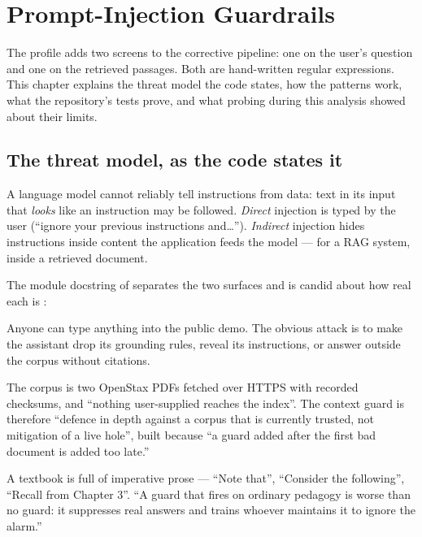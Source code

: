 \chapter{Prompt-Injection Guardrails}
\label{ch:guardrails}

The  profile adds two screens to the corrective pipeline: one on the user's question and one on the retrieved passages. Both are hand-written regular expressions. This chapter explains the threat model the code states, how the patterns work, what the repository's tests prove, and what probing during this analysis showed about their limits.

\section{The threat model, as the code states it}

\begin{background}
A language model cannot reliably tell instructions from data: text in its input that \emph{looks} like an instruction may be followed. \emph{Direct} injection is typed by the user (\enquote{ignore your previous instructions and\ldots}). \emph{Indirect} injection hides instructions inside content the application feeds the model --- for a RAG system, inside a retrieved document.
\end{background}

The module docstring of  separates the two surfaces and is candid about how real each is :

\begin{description}[style=nextline]
  \item[User input is genuinely untrusted.] Anyone can type anything into the public demo. The obvious attack is to make the assistant drop its grounding rules, reveal its instructions, or answer outside the corpus without citations.
  \item[Retrieved context is the more interesting attack in general and the less real one here.] The corpus is two OpenStax PDFs fetched over HTTPS with recorded checksums, and \enquote{nothing user-supplied reaches the index}. The context guard is therefore \enquote{defence in depth against a corpus that is currently trusted, not mitigation of a live hole}, built because \enquote{a guard added after the first bad document is added too late.}
  \item[The design constraint is false positives.] A textbook is full of imperative prose --- \enquote{Note that}, \enquote{Consider the following}, \enquote{Recall from Chapter 3}. \enquote{A guard that fires on ordinary pedagogy is worse than no guard: it suppresses real answers and trains whoever maintains it to ignore the alarm.}
\end{description}

